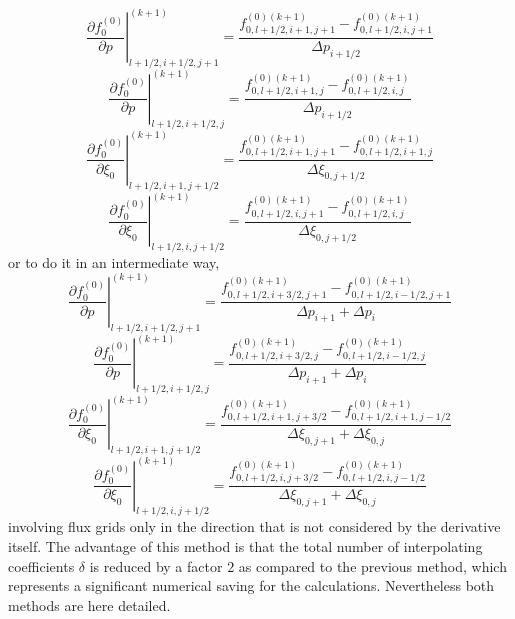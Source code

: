 \begin{equation}
\left. \frac{\partial f_{0}^{\left( 0\right) }}{\partial p}\right\vert
_{l+1/2,i+1/2,j+1}^{(k+1)}=\frac{f_{0,l+1/2,i+1,j+1}^{\left( 0\right)
(k+1)}-f_{0,l+1/2,i,j+1}^{\left( 0\right) (k+1)}}{\Delta p_{i+1/2}}
\label{deriv1}
\end{equation}%
\begin{equation}
\left. \frac{\partial f_{0}^{\left( 0\right) }}{\partial p}\right\vert
_{l+1/2,i+1/2,j}^{(k+1)}=\frac{f_{0,l+1/2,i+1,j}^{\left( 0\right)
(k+1)}-f_{0,l+1/2,i,j}^{\left( 0\right) (k+1)}}{\Delta p_{i+1/2}}
\label{deriv2}
\end{equation}%
\begin{equation}
\left. \frac{\partial f_{0}^{\left( 0\right) }}{\partial \xi _{0}}%
\right\vert _{l+1/2,i+1,j+1/2}^{(k+1)}=\frac{f_{0,l+1/2,i+1,j+1}^{\left(
0\right) (k+1)}-f_{0,l+1/2,i+1,j}^{\left( 0\right) (k+1)}}{\Delta \xi
_{0,j+1/2}}  \label{deriv3}
\end{equation}%
\begin{equation}
\left. \frac{\partial f_{0}^{\left( 0\right) }}{\partial \xi _{0}}%
\right\vert _{l+1/2,i,j+1/2}^{(k+1)}=\frac{f_{0,l+1/2,i,j+1}^{\left(
0\right) (k+1)}-f_{0,l+1/2,i,j}^{\left( 0\right) (k+1)}}{\Delta \xi
_{0,j+1/2}}  \label{deriv4}
\end{equation}%
or to do it in an intermediate way,%
\begin{equation}
\left. \frac{\partial f_{0}^{\left( 0\right) }}{\partial p}\right\vert
_{l+1/2,i+1/2,j+1}^{(k+1)}=\frac{f_{0,l+1/2,i+3/2,j+1}^{\left( 0\right)
(k+1)}-f_{0,l+1/2,i-1/2,j+1}^{\left( 0\right) (k+1)}}{\Delta p_{i+1}+\Delta
p_{i}}
\end{equation}%
\begin{equation}
\left. \frac{\partial f_{0}^{\left( 0\right) }}{\partial p}\right\vert
_{l+1/2,i+1/2,j}^{(k+1)}=\frac{f_{0,l+1/2,i+3/2,j}^{\left( 0\right)
(k+1)}-f_{0,l+1/2,i-1/2,j}^{\left( 0\right) (k+1)}}{\Delta p_{i+1}+\Delta
p_{i}}
\end{equation}%
\begin{equation}
\left. \frac{\partial f_{0}^{\left( 0\right) }}{\partial \xi _{0}}%
\right\vert _{l+1/2,i+1,j+1/2}^{(k+1)}=\frac{f_{0,l+1/2,i+1,j+3/2}^{\left(
0\right) (k+1)}-f_{0,l+1/2,i+1,j-1/2}^{\left( 0\right) (k+1)}}{\Delta \xi
_{0,j+1}+\Delta \xi _{0,j}}
\end{equation}%
\begin{equation}
\left. \frac{\partial f_{0}^{\left( 0\right) }}{\partial \xi _{0}}%
\right\vert _{l+1/2,i,j+1/2}^{(k+1)}=\frac{f_{0,l+1/2,i,j+3/2}^{\left(
0\right) (k+1)}-f_{0,l+1/2,i,j-1/2}^{\left( 0\right) (k+1)}}{\Delta \xi
_{0,j+1}+\Delta \xi _{0,j}}
\end{equation}%
involving flux grids only in the direction that is not considered by the
derivative itself. The advantage of this method is that the total number of
interpolating coefficients $\delta $ is reduced by a factor $2$  as compared
to the previous method, which represents a significant numerical saving for
the calculations. Nevertheless both methods are here detailed.

